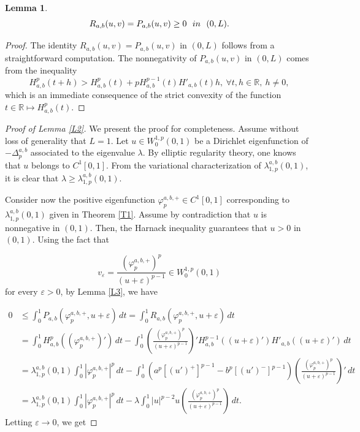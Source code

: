 \documentclass[a4paper,11pt]{article}
\newcommand{\R}{\mathbb{R}}
\newtheorem{lema}{Lemma}[section]
\begin{document}
{\begin{lema}
\[
R_{a,b}(u,v) = P_{a,b}(u,v) \geq 0 \ \ {\rm in}\ \ (0, L).
\]
\end{lema}

\begin{proof} The identity $R_{a,b}(u,v) = P_{a,b}(u,v)$ in $(0,L)$ follows from a straightforward computation. The nonnegativity of $P_{a,b}(u,v)$ in $(0,L)$ comes from the inequality
\[
H_{a,b}^{p}(t+h) > H_{a,b}^{p}(t) + p H_{a,b}^{p-1}(t)H'_{a,b}(t)h,\ \forall t, h \in \R,\ h \neq 0,
\]
which is an immediate consequence of the strict convexity of the function $t \in \R \mapsto H_{a,b}^{p}(t)$.
\end{proof}

\begin{proof}[Proof of Lemma \ref{L2}] We present the proof for completeness. Assume without loss of generality that $L = 1$. Let $u \in W_0^{1,p}(0,1)$ be a Dirichlet eigenfunction of $-\Delta_{p}^{a,b}$ associated to the eigenvalue $\lambda$. By elliptic regularity theory, one knows that $u$ belongs to $C^1[0,1]$. From the variational characterization of $\lambda_{1,p}^{a,b}(0,1)$, it is clear that $\lambda \geq \lambda_{1,p}^{a,b}(0,1)$.

Consider now the positive eigenfunction $\varphi_{p}^{a,b,+} \in C^1[0,1]$ corresponding to $\lambda_{1,p}^{a,b}(0,1)$ given in Theorem \ref{T1}. Assume by contradiction that $u$ is nonnegative in $(0,1)$. Then, the Harnack inequality guarantees that $u > 0$ in $(0,1)$. Using the fact that

\[
v_{\varepsilon} = \frac{(\varphi_{p}^{a,b,+})^{p}}{(u+\varepsilon)^{p-1}} \in W^{1,p}_{0}(0,1)
\]
for every $\varepsilon > 0$, by Lemma \ref{L3}, we have

\begin{align*}
0 & \leq \int_{0}^{1} P_{a,b}(\varphi_{p}^{a,b,+}, u + \varepsilon) \, dt = \int_{0}^{1} R_{a,b}(\varphi_{p}^{a,b,+},u+\varepsilon) \, dt  \\
& = \int_{0}^{1} H_{a,b}^{p}((\varphi_{p}^{a,b,+})') \, dt - \int_{0}^{1} \left( \frac{(\varphi_{p}^{a,b,+})^{p}}{(u+\varepsilon)^{p-1}} \right)' H_{a,b}^{p-1}((u + \varepsilon)')
H'_{a,b}((u + \varepsilon)') \, dt \\
& = \lambda_{1,p}^{a,b}(0,1) \int_{0}^{1}|\varphi_{p}^{a,b,+}|^{p} \, dt - \int_{0}^{1}\left(a^{p}[(u')^{+}]^{p-1}-b^{p}[(u')^{-}]^{p-1}\right) \left(\frac{(\varphi_{p}^{a,b,+})^{p}}{(u+\varepsilon)^{p-1}}\right)' \, dt \\
& = \lambda_{1,p}^{a,b}(0,1)\int_{0}^{1}|\varphi_{p}^{a,b,+}|^{p} \,dt - \lambda\int_{0}^{1}|u|^{p-2}u\left(\frac{(\varphi_{p}^{a,b,+})^{p}}{(u+\varepsilon)^{p-1}}\right) \, dt.
\end{align*}
Letting $\varepsilon \rightarrow 0$, we get


\end{proof}}
\end{document}
